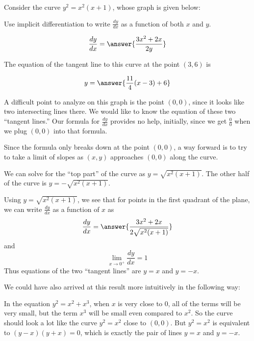 \documentclass{ximera}
\author{Steven Gubkin}
\begin{document}
\begin{exercise}

Consider the curve  $y^2 = x^2(x+1)$, whose graph is given below:

\begin{image}
\end{image}

Use implicit differentiation to write $\frac{dy}{dx}$ as a function of both $x$ and $y$.

\[
\frac{dy}{dx} = \answer{\frac{3x^2+2x}{2y}}
\]

The equation of the tangent line to this curve at the point $(3,6)$ is

\[
y = \answer{\frac{11}{4}(x-3)+6}
\]

A difficult point to analyze on this graph is the point $(0,0)$, since
it looks like two intersecting lines there.  We would like to know the
equation of these two ``tangent lines.''  Our formula for
$\frac{dy}{dx}$ provides no help, initially, since we get
$\frac{0}{0}$ when we plug $(0,0)$ into that formula.

Since the formula only breaks down at the point $(0,0)$, a way forward
is to try to take a limit of slopes as $(x,y)$ approaches $(0,0)$
along the curve.

We can solve for the ``top part'' of the curve as $y =
\sqrt{x^2(x+1)}$.  The other half of the curve is $y =
-\sqrt{x^2(x+1)}$.

Using $y = \sqrt{x^2(x+1)}$, we see that for points in the first
quadrant of the plane, we can write $\frac{dy}{dx}$ as a function of
$x$ as
\[
\frac{dy}{dx} = \answer{\frac{3x^2+2x}{2\sqrt{x^2(x+1)}}}
\]
and
\[
\lim_{x \to 0^+} \frac{dy}{dx} = 1
\]
Thus equations of the two ``tangent lines'' are $y=x$ and $y=-x$.

We could have also arrived at this result more intuitively in the following way:

In the equation $y^2 = x^2+x^3$, when $x$ is very close to $0$, all of
the terms will be very small, but the term $x^3$ will be small even
compared to $x^2$.  So the curve should look a lot like the curve $y^2
= x^2$ close to $(0,0)$.  But $y^2 = x^2$ is equivalent to
$(y-x)(y+x)=0$, which is exactly the pair of lines $y=x$ and $y=-x$.
\end{exercise}
\end{document}
